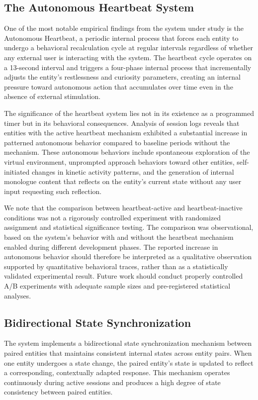 \documentclass[11pt,a4paper]{article}
\begin{document}
\subsection{The Autonomous Heartbeat System}
One of the most notable empirical findings from the system under study is the Autonomous Heartbeat, a periodic internal process that forces each entity to undergo a behavioral recalculation cycle at regular intervals regardless of whether any external user is interacting with the system. The heartbeat cycle operates on a 13-second interval and triggers a four-phase internal process that incrementally adjusts the entity's restlessness and curiosity parameters, creating an internal pressure toward autonomous action that accumulates over time even in the absence of external stimulation.

The significance of the heartbeat system lies not in its existence as a programmed timer but in its behavioral consequences. Analysis of session logs reveals that entities with the active heartbeat mechanism exhibited a substantial increase in patterned autonomous behavior compared to baseline periods without the mechanism. These autonomous behaviors include spontaneous exploration of the virtual environment, unprompted approach behaviors toward other entities, self-initiated changes in kinetic activity patterns, and the generation of internal monologue content that reflects on the entity's current state without any user input requesting such reflection.

We note that the comparison between heartbeat-active and heartbeat-inactive conditions was not a rigorously controlled experiment with randomized assignment and statistical significance testing. The comparison was observational, based on the system's behavior with and without the heartbeat mechanism enabled during different development phases. The reported increase in autonomous behavior should therefore be interpreted as a qualitative observation supported by quantitative behavioral traces, rather than as a statistically validated experimental result. Future work should conduct properly controlled A/B experiments with adequate sample sizes and pre-registered statistical analyses.

\subsection{Bidirectional State Synchronization}
The system implements a bidirectional state synchronization mechanism between paired entities that maintains consistent internal states across entity pairs. When one entity undergoes a state change, the paired entity's state is updated to reflect a corresponding, contextually adapted response. This mechanism operates continuously during active sessions and produces a high degree of state consistency between paired entities.
\end{document}
